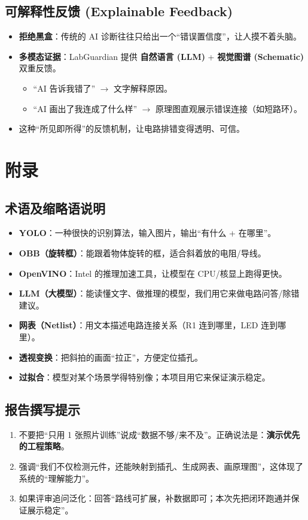 \documentclass[a4paper,AutoFakeBold,oneside,12pt]{book}
\begin{document}
\section{可解释性反馈 (Explainable Feedback)}
\begin{itemize}
    \item \textbf{拒绝黑盒}：传统的 AI 诊断往往只给出一个“错误置信度”，让人摸不着头脑。
    \item \textbf{多模态证据}：LabGuardian 提供 \textbf{自然语言 (LLM)} + \textbf{视觉图谱 (Schematic)} 双重反馈。
    \begin{itemize}
        \item “AI 告诉我错了” $\rightarrow$ 文字解释原因。
        \item “AI 画出了我连成了什么样” $\rightarrow$ 原理图直观展示错误连接（如短路环）。
    \end{itemize}
    \item 这种“所见即所得”的反馈机制，让电路排错变得透明、可信。
\end{itemize}

\chapter{附录}

\section{术语及缩略语说明}
\begin{itemize}
    \item \textbf{YOLO}：一种很快的识别算法，输入图片，输出“有什么 + 在哪里”。
    \item \textbf{OBB（旋转框）}：能跟着物体旋转的框，适合斜着放的电阻/导线。
    \item \textbf{OpenVINO}：Intel 的推理加速工具，让模型在 CPU/核显上跑得更快。
    \item \textbf{LLM（大模型）}：能读懂文字、做推理的模型，我们用它来做电路问答/除错建议。
    \item \textbf{网表（Netlist）}：用文本描述电路连接关系（R1 连到哪里，LED 连到哪里）。
    \item \textbf{透视变换}：把斜拍的画面“拉正”，方便定位插孔。
    \item \textbf{过拟合}：模型对某个场景学得特别像；本项目用它来保证演示稳定。
\end{itemize}

\section{报告撰写提示}
\begin{enumerate}
    \item 不要把“只用 1 张照片训练”说成“数据不够/来不及”。正确说法是：\textbf{演示优先的工程策略}。
    \item 强调“我们不仅检测元件，还能映射到插孔、生成网表、画原理图”，这体现了系统的“理解能力”。
    \item 如果评审追问泛化：回答“路线可扩展，补数据即可；本次先把闭环跑通并保证展示稳定”。
\end{enumerate}
\end{document}
